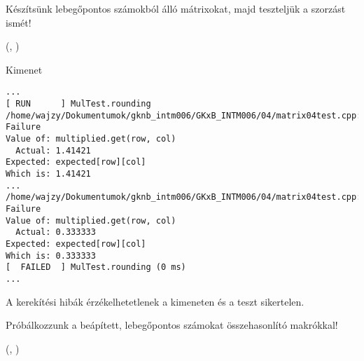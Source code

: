 \documentclass[usenames,dvipsnames,aspectratio=169]{beamer}
\begin{document}
\begin{frame}
  Készítsünk lebegőpontos számokból álló mátrixokat, majd teszteljük a szorzást ismét!
  \begin{exampleblock}{ %
    (, %
     )}
    \small
    
  \end{exampleblock}
\end{frame}

\begin{frame}
  \begin{exampleblock}{}
    \small
    
  \end{exampleblock}
\end{frame}

\begin{frame}[fragile]
  \begin{block}{Kimenet}
    \scriptsize
    \begin{verbatim}
...
[ RUN      ] MulTest.rounding
/home/wajzy/Dokumentumok/gknb_intm006/GKxB_INTM006/04/matrix04test.cpp:49: Failure
Value of: multiplied.get(row, col)
  Actual: 1.41421
Expected: expected[row][col]
Which is: 1.41421
...
/home/wajzy/Dokumentumok/gknb_intm006/GKxB_INTM006/04/matrix04test.cpp:49: Failure
Value of: multiplied.get(row, col)
  Actual: 0.333333
Expected: expected[row][col]
Which is: 0.333333
[  FAILED  ] MulTest.rounding (0 ms)
...
\end{verbatim}
  \end{block}
  A kerekítési hibák érzékelhetetlenek a kimeneten és a teszt sikertelen.
\end{frame}

\begin{frame}
  Próbálkozzunk a beápített, lebegőpontos számokat összehasonlító makrókkal!
  \begin{exampleblock}{ %
    (, %
     )}
    \footnotesize
    
  \end{exampleblock}
\end{frame}
\end{document}
